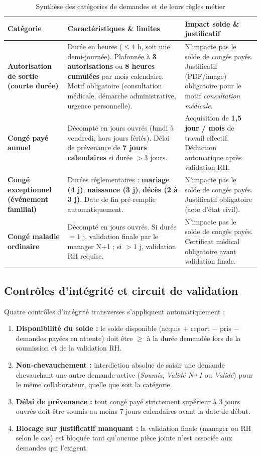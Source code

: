 \documentclass[11pt,a4paper]{article}
\begin{document}
\begin{table}[H]
\centering
\caption{Synthèse des catégories de demandes et de leurs règles métier}
\label{tab:specs}
\small
\begin{tabularx}{\textwidth}{>{\bfseries}p{3.4cm} Y Y}
\toprule
Catégorie & Caractéristiques \& limites & Impact solde \& justificatif \\
\midrule
Autorisation de sortie (courte durée) &
Durée en heures ($\leq 4\text{ h}$, soit une demi-journée). Plafonnée à \textbf{3 autorisations} ou \textbf{8 heures cumulées} par mois calendaire. Motif obligatoire (consultation médicale, démarche administrative, urgence personnelle). &
N'impacte pas le solde de congés payés. Justificatif (PDF/image) obligatoire pour le motif \textit{consultation médicale}. \\
\midrule
Congé payé annuel &
Décompté en jours ouvrés (lundi à vendredi, hors jours fériés). Délai de prévenance de \textbf{7 jours calendaires} si durée $> 3\text{ jours}$. &
Acquisition de \textbf{1,5 jour / mois} de travail effectif. Déduction automatique après validation RH. \\
\midrule
Congé exceptionnel (événement familial) &
Durées réglementaires : \textbf{mariage (4 j)}, \textbf{naissance (3 j)}, \textbf{décès (2 à 3 j)}. Date de fin pré-remplie automatiquement. &
N'impacte pas le solde de congés payés. Justificatif obligatoire (acte d'état civil). \\
\midrule
Congé maladie ordinaire &
Décompté en jours ouvrés. Si durée $= 1\text{ j}$, validation finale par le manager N+1 ; si $> 1\text{ j}$, validation RH requise. &
N'impacte pas le solde de congés payés. Certificat médical obligatoire avant validation finale. \\
\bottomrule
\end{tabularx}
\end{table}

\subsection{Contrôles d'intégrité et circuit de validation}
Quatre contrôles d'intégrité transverses s'appliquent automatiquement :
\begin{enumerate}[itemsep=2pt]
    \item \textbf{Disponibilité du solde :} le solde disponible (acquis + report $-$ pris $-$ demandes payées en attente) doit être $\geq$ à la durée demandée lors de la soumission et de la validation RH.
    \item \textbf{Non-chevauchement :} interdiction absolue de saisir une demande chevauchant une autre demande active (\textit{Soumis}, \textit{Validé N+1} ou \textit{Validé}) pour le même collaborateur, quelle que soit la catégorie.
    \item \textbf{Délai de prévenance :} tout congé payé strictement supérieur à 3 jours ouvrés doit être soumis au moins 7 jours calendaires avant la date de début.
    \item \textbf{Blocage sur justificatif manquant :} la validation finale (manager ou RH selon le cas) est bloquée tant qu'aucune pièce jointe n'est associée aux demandes qui l'exigent.
\end{enumerate}
\end{document}
